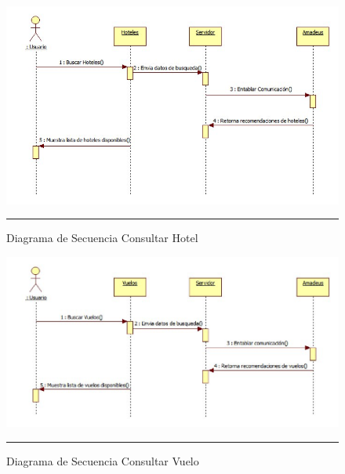 \begin{figure}[h]
	\centering
		\includegraphics[width=1\textwidth]{Figuras/secConsultarHotel.png}
		\rule{30em}{0.5pt}
	\caption[Diagrama de Secuencia Consultar Hotel]{Diagrama de Secuencia Consultar Hotel}
	\label{fig:secConsultarHotel}
\end{figure}

\begin{figure}[h]
	\centering
		\includegraphics[width=1\textwidth]{Figuras/secConsultarVuelo.png}
		\rule{30em}{0.5pt}
	\caption[Diagrama de Secuencia Consultar Vuelo]{Diagrama de Secuencia Consultar Vuelo}
	\label{fig:secConsultarVuelo}
\end{figure}

